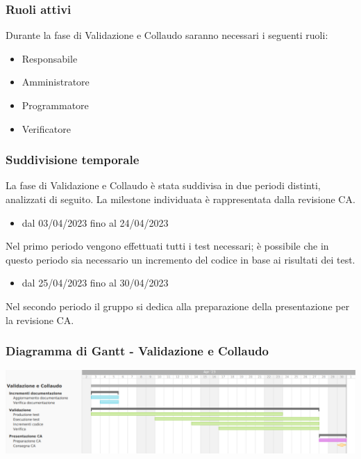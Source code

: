 \subsubsection{Ruoli attivi}
Durante la fase di Validazione e Collaudo saranno necessari i seguenti ruoli:
\begin{itemize}
	\item Responsabile
    \item Amministratore
    \item Programmatore
    \item Verificatore
\end{itemize}

\subsubsection{Suddivisione temporale}
La fase di Validazione e Collaudo è stata suddivisa in due periodi distinti, analizzati di seguito. La milestone individuata è rappresentata dalla revisione CA.

\begin{itemize}
    \item dal 03/04/2023 fino al 24/04/2023
\end{itemize}
Nel primo periodo vengono effettuati tutti i test necessari; è possibile che in questo periodo sia necessario un incremento del codice in base ai risultati dei test.

\begin{itemize}
    \item dal 25/04/2023 fino al 30/04/2023
\end{itemize}
Nel secondo periodo il gruppo si dedica alla preparazione della presentazione per la revisione CA.

\subsubsection{Diagramma di Gantt - Validazione e Collaudo}
\includegraphics[width=\textwidth]{img/4_collaudo.png}\\
